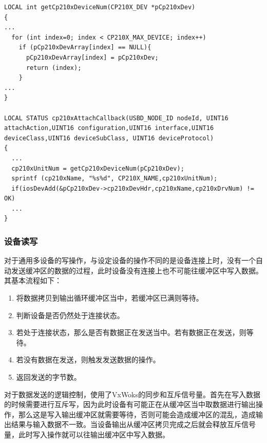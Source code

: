 \lstset{language=C}
\begin{lstlisting}
LOCAL int getCp210xDeviceNum(CP210X_DEV *pCp210xDev)
{
...
  for (int index=0; index < CP210X_MAX_DEVICE; index++)
    if (pCp210xDevArray[index] == NULL){
      pCp210xDevArray[index] = pCp210xDev;
      return (index);
    }
...
}
	
LOCAL STATUS cp210xAttachCallback(USBD_NODE_ID nodeId, UINT16 attachAction,UINT16 configuration,UINT16 interface,UINT16 deviceClass,UINT16 deviceSubClass, UINT16 deviceProtocol)
{
  ...
  cp210xUnitNum = getCp210xDeviceNum(pCp210xDev);
  sprintf (cp210xName, "%s%d", CP210X_NAME,cp210xUnitNum);
  if(iosDevAdd(&pCp210xDev->cp210xDevHdr,cp210xName,cp210xDrvNum) != OK)
  ...
}
\end{lstlisting}

\subsubsection{设备读写}
	对于通用多设备的写操作，与设定设备的操作不同的是设备连接上时，没有一个自动发送缓冲区的数据的过程，此时设备没有连接上也不可能往缓冲区中写入数据。其基本流程如下：	
	
	\begin{enumerate}
	\item 将数据拷贝到输出循环缓冲区当中，若缓冲区已满则等待。
	\item 判断设备是否仍然处于连接状态。
	\item 若处于连接状态，那么是否有数据正在发送当中。若有数据正在发送，则等待。
	\item 若没有数据在发送，则触发发送数据的操作。
	\item 返回发送的字节数。
	\end{enumerate}
	
	对于数据发送的逻辑控制，使用了VxWoks的同步和互斥信号量。首先在写入数据的时候需要进行互斥写，因为此时设备有可能正在从缓冲区当中取数据进行输出操作，那么这是写入输出缓冲区就需要等待，否则可能会造成缓冲区的混乱，造成输出结果与输入数据不一致。当设备输出从缓冲区拷贝完成之后就会释放互斥信号量，此时写入操作就可以往输出缓冲区中写入数据。
	
